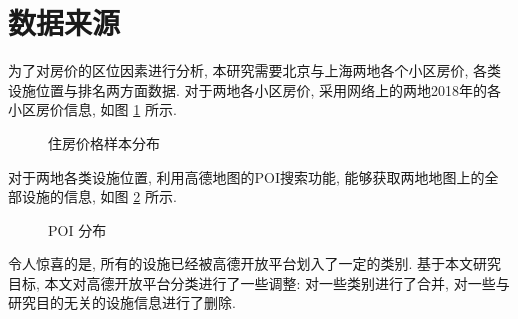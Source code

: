 \section{数据来源}
为了对房价的区位因素进行分析, 本研究需要北京与上海两地各个小区房价, 各类设施位置与排名两方面数据.
对于两地各小区房价, 采用网络上的两地2018年的各小区房价信息, 如图 \ref{fig:housing} 所示.

\begin{figure}[H]
  \centering
  \caption{住房价格样本分布}
  \label{fig:housing}
\end{figure}

对于两地各类设施位置, 利用高德地图的POI搜索功能, 能够获取两地地图上的全部设施的信息, 如图 \ref{fig:poi} 所示.

\begin{figure}[H]
  \centering
  \caption{POI 分布}
  \label{fig:poi}
\end{figure}

令人惊喜的是, 所有的设施已经被高德开放平台划入了一定的类别.
基于本文研究目标, 本文对高德开放平台分类进行了一些调整: 对一些类别进行了合并, 对一些与研究目的无关的设施信息进行了删除.
